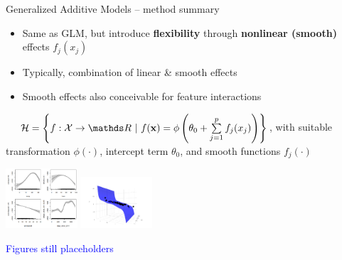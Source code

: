 \begin{vbframe}{Generalized Additive Models -- method summary}

  
 
\medskip

\begin{itemize}
  \item Same as GLM, but introduce \textbf{flexibility} through
  \textbf{nonlinear (smooth)} effects $f_j(x_j)$
  \item Typically, combination of linear \& smooth effects
  \item Smooth effects also conceivable for feature interactions
\end{itemize}
\medskip

 ~~
$\Hspace = \left\{f: \Xspace \to \R ~|~\fx = \phi \left(\theta_0 + \sumjp
f_j(x_j) \right) \right\}$,
with suitable transformation $\phi(\cdot)$, intercept term $\theta_0$, and smooth
functions $f_j(\cdot)$

\vfill

\includegraphics[width=0.2\textwidth]{figure/smooth_effects}
\includegraphics[width=0.2\textwidth]{figure/reg_poly_biv}

\textcolor{blue}{Figures still placeholders}

\framebreak



\end{vbframe}
